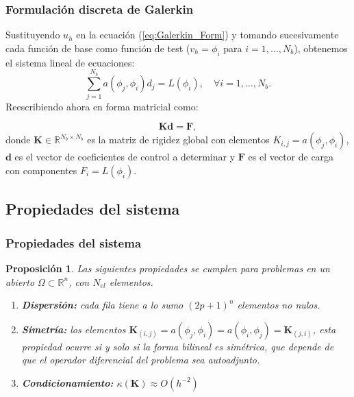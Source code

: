 \documentclass[compress]{beamer}
\newtheorem{proposition}[theorem]{Proposición}
\newcommand\R{\mathbb{R}}
\begin{document}
\begin{frame}
	\frametitle{Formulación discreta de Galerkin}
	\begin{definition}
		Sustituyendo $u_h$ en la ecuación (\ref{eq:Galerkin_Form}) y tomando sucesivamente cada función de base como función de test ($v_h = \phi_i$ para $i=1,\dots,N_b$), obtenemos el sistema lineal de ecuaciones:
		\begin{equation*}
			\sum_{j=1}^{N_b} a(\phi_j, \phi_i) d_j = L(\phi_i), \quad \forall i=1,\dots,N_b.
		\end{equation*}
		Reescribiendo ahora en forma matricial como:

		\vspace{-10pt}
		\begin{equation*}
			\mathbf{K} \mathbf{d} = \mathbf{F},
		\end{equation*}
		donde $\mathbf{K}\in \mathbb{R}^{N_b \times N_b}$ es la matriz de rigidez global con elementos $K_{i,j} = a(\phi_j, \phi_i)$, $\mathbf{d}$ es el vector de coeficientes de control a determinar y $\mathbf{F}$ es el vector de carga con componentes $F_i = L(\phi_i)$.
		\end{definition}
\end{frame}

\subsection{Propiedades del sistema}

\begin{frame}
	\frametitle{Propiedades del sistema}
	\begin{proposition}
		Las siguientes propiedades se cumplen para problemas en un abierto $\Omega \subset \R^n$, con $N_{el}$ elementos.
		\begin{enumerate}
			\item \textbf{Dispersión:} cada fila tiene a lo sumo $(2p+1)^n$ elementos no nulos.
			\item \textbf{Simetría:} los elementos $\mathbf{K}_{(i,j)}=a(\phi_j,\phi_i)=a(\phi_i,\phi_j)=\mathbf{K}_{(j,i)}$, esta propiedad ocurre si y solo si la forma bilineal es simétrica, que depende de que el operador diferencial del problema sea autoadjunto.
			\item \textbf{Condicionamiento:} $\kappa(\mathbf{K}) \approx O(h^{-2})$
		\end{enumerate}
			
	\end{proposition}

\end{frame}
\end{document}
